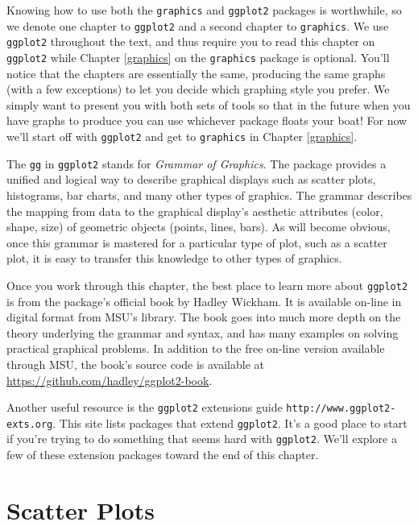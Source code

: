 \documentclass[]{krantz}
\begin{document}
Knowing how to use both the \texttt{graphics} and \texttt{ggplot2}
packages is worthwhile, so we denote one chapter to \texttt{ggplot2} and
a second chapter to \texttt{graphics}. We use \texttt{ggplot2}
throughout the text, and thus require you to read this chapter on
\texttt{ggplot2} while Chapter \ref{graphics} on the \texttt{graphics}
package is optional. You'll notice that the chapters are essentially the
same, producing the same graphs (with a few exceptions) to let you
decide which graphing style you prefer. We simply want to present you
with both sets of tools so that in the future when you have graphs to
produce you can use whichever package floats your boat! For now we'll
start off with \texttt{ggplot2} and get to \texttt{graphics} in Chapter
\ref{graphics}.

The \texttt{gg} in \texttt{ggplot2} stands for \emph{Grammar of
Graphics}. The package provides a unified and logical way to describe
graphical displays such as scatter plots, histograms, bar charts, and
many other types of graphics. The grammar describes the mapping from
data to the graphical display's aesthetic attributes (color, shape,
size) of geometric objects (points, lines, bars). As will become
obvious, once this grammar is mastered for a particular type of plot,
such as a scatter plot, it is easy to transfer this knowledge to other
types of graphics.

Once you work through this chapter, the best place to learn more about
\texttt{ggplot2} is from the package's official book
\citet{WickhamGgplot2Book} by Hadley Wickham. It is available on-line in
digital format from MSU's library. The book goes into much more depth on
the theory underlying the grammar and syntax, and has many examples on
solving practical graphical problems. In addition to the free on-line
version available through MSU, the book's source code is available at
\url{https://github.com/hadley/ggplot2-book}.

Another useful resource is the \texttt{ggplot2} extensions guide
\texttt{http://www.ggplot2-exts.org}. This site lists packages that
extend \texttt{ggplot2}. It's a good place to start if you're trying to
do something that seems hard with \texttt{ggplot2}. We'll explore a few
of these extension packages toward the end of this chapter.

\section{Scatter Plots}\label{scatter-plots}
\end{document}
